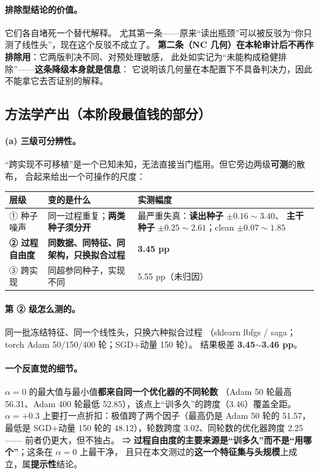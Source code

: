 \documentclass[11pt,a4paper]{ctexart}
\begin{document}
\paragraph{排除型结论的价值。}
它们各自堵死一个替代解释。
尤其第一条——原来“读出瓶颈”可以被反驳为“你只测了线性头”，现在这个反驳不成立了。
\textbf{第二条（NC 几何）在本轮审计后不再作排除用}：它两版判决不同、对预处理敏感，
此处如实记为“未能构成稳健排除”——\textbf{这条降级本身就是信息}：
它说明该几何量在本配置下不具备判决力，因此不能拿它去否证别的解释。

\subsection{方法学产出（本阶段最值钱的部分）}

\paragraph{(a) 三级可分辨性。}
“跨实现不可移植”是一个已知未知，无法直接当门槛用。但它旁边两级\textbf{可测}的散布，
合起来给出一个可操作的尺度：

\begin{center}
\small
\begin{tabular}{llp{6.6cm}}
\toprule
层级 & 变的是什么 & 实测幅度 \\
\midrule
① 种子噪声 & 同一过程重复；\textbf{两类种子须分开} & 最严重失真：\textbf{读出种子} $\pm0.16\sim3.40$、
  \textbf{主干种子} $\pm0.25\sim2.61$；clean $\pm0.07\sim1.85$ \\
\textbf{② 过程自由度} & \textbf{同数据、同特征、同架构，只换拟合过程} & \textbf{3.45 pp} \\
③ 跨实现 & 同超参同种子，实现不同 & 5.55 pp（未归因） \\
\bottomrule
\end{tabular}
\end{center}

\paragraph{第 ② 级怎么测的。}
同一批冻结特征、同一个线性头，只换六种拟合过程
（sklearn lbfgs / saga；torch Adam 50/150/400 轮；SGD+动量 150 轮）。
结果极差 \textbf{3.45$\sim$3.46 pp}。

\paragraph{一个反直觉的细节。}
$\alpha=0$ 的最大值与最小值\textbf{都来自同一个优化器的不同轮数}
（Adam 50 轮最高 56.31、Adam 400 轮最低 52.85），该点上“训多久”的跨度（3.46）覆盖全距。
$\alpha=+0.3$ 上要打一点折扣：极值跨了两个因子（最高仍是 Adam 50 轮的 51.57，
最低是 SGD$+$动量 150 轮的 48.12），轮数跨度 3.02、同轮数的优化器跨度 2.25——
前者仍更大，但不独占。
⇒ \textbf{过程自由度的主要来源是“训多久”而不是“用哪个”}；这条在 $\alpha=0$ 上最干净，
且只在本文测过的\textbf{这一个特征集与头规模}上成立，属\textbf{提示性}结论。
\end{document}
